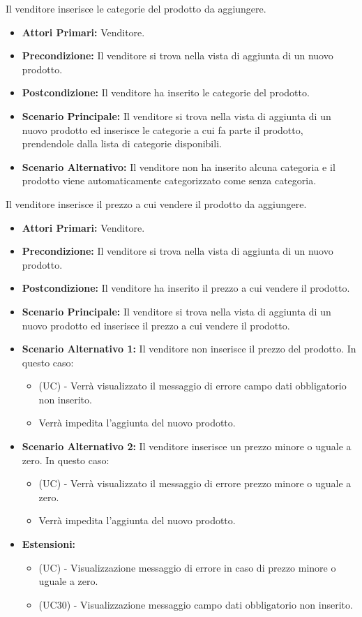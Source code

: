 Il venditore inserisce le categorie del prodotto da aggiungere.
\begin{itemize}
    \item \textbf{Attori Primari:} Venditore.
    \item \textbf{Precondizione:} Il venditore si trova nella vista di aggiunta di un nuovo prodotto.
    \item \textbf{Postcondizione:} Il venditore ha inserito le categorie del prodotto.
    \item \textbf{Scenario Principale:} Il venditore si trova nella vista di aggiunta di un nuovo prodotto ed inserisce le categorie a cui fa parte il prodotto, prendendole dalla lista di categorie disponibili.
    \item \textbf{Scenario Alternativo:} Il venditore non ha inserito alcuna categoria e il prodotto viene automaticamente categorizzato come senza categoria.
\end{itemize}

Il venditore inserisce il prezzo a cui vendere il prodotto da aggiungere.
\begin{itemize}
    \item \textbf{Attori Primari:} Venditore.
    \item \textbf{Precondizione:} Il venditore si trova nella vista di aggiunta di un nuovo prodotto.
    \item \textbf{Postcondizione:} Il venditore ha inserito il prezzo a cui vendere il prodotto.
    \item \textbf{Scenario Principale:} Il venditore si trova nella vista di aggiunta di un nuovo prodotto ed inserisce il prezzo a cui vendere il prodotto.
    \item \textbf{Scenario Alternativo 1:} Il venditore non inserisce il prezzo del prodotto. In questo caso:
    \begin{itemize}
        \item (UC) - Verrà visualizzato il messaggio di errore campo dati obbligatorio non inserito.
        \item Verrà impedita l'aggiunta del nuovo prodotto.
    \end{itemize}
    \item \textbf{Scenario Alternativo 2:} Il venditore inserisce un prezzo minore o uguale a zero. In questo caso:
    \begin{itemize}
        \item (UC) - Verrà visualizzato il messaggio di errore prezzo minore o uguale a zero.
        \item Verrà impedita l'aggiunta del nuovo prodotto.
    \end{itemize}
    \item \textbf{Estensioni:}
    \begin{itemize}
        \item (UC) - Visualizzazione messaggio di errore in caso di prezzo minore o uguale a zero.
        \item (UC30) - Visualizzazione messaggio campo dati obbligatorio non inserito.
    \end{itemize}
\end{itemize}

